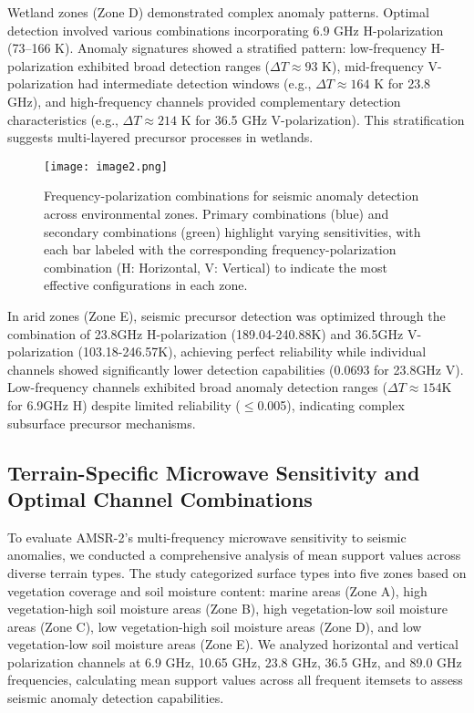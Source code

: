 \documentclass[fleqn,10pt]{wlscirep_mdpi_style}
\begin{document}
Wetland zones (Zone D) demonstrated complex anomaly patterns. Optimal detection involved various combinations incorporating 6.9 GHz H-polarization (73–166 K). Anomaly signatures showed a stratified pattern: low-frequency H-polarization exhibited broad detection ranges ($\Delta T \approx 93$ K), mid-frequency V-polarization had intermediate detection windows (e.g., $\Delta T \approx 164$ K for 23.8 GHz), and high-frequency channels provided complementary detection characteristics (e.g., $\Delta T \approx 214$ K for 36.5 GHz V-polarization). This stratification suggests multi-layered precursor processes in wetlands.

\begin{figure}[!htbp]
\centering
\texttt{[image: image2.png]}
\caption{Frequency-polarization combinations for seismic anomaly detection across environmental zones. Primary combinations (blue) and secondary combinations (green) highlight varying sensitivities, with each bar labeled with the corresponding frequency-polarization combination (H: Horizontal, V: Vertical) to indicate the most effective configurations in each zone.}
\label{fig:fig2}
\end{figure}
 
In arid zones (Zone E), seismic precursor detection was optimized through the combination of 23.8GHz H-polarization (189.04-240.88K) and 36.5GHz V-polarization (103.18-246.57K), achieving perfect reliability while individual channels showed significantly lower detection capabilities (0.0693 for 23.8GHz V). Low-frequency channels exhibited broad anomaly detection ranges ($\Delta T \approx 154$K for 6.9GHz H) despite limited reliability ($\le$0.005), indicating complex subsurface precursor mechanisms.
 
 
\subsection{Terrain-Specific Microwave Sensitivity and Optimal Channel Combinations}
To evaluate AMSR-2's multi-frequency microwave sensitivity to seismic anomalies, we conducted a comprehensive analysis of mean support values across diverse terrain types. The study categorized surface types into five zones based on vegetation coverage and soil moisture content: marine areas (Zone A), high vegetation-high soil moisture areas (Zone B), high vegetation-low soil moisture areas (Zone C), low vegetation-high soil moisture areas (Zone D), and low vegetation-low soil moisture areas (Zone E). We analyzed horizontal and vertical polarization channels at 6.9 GHz, 10.65 GHz, 23.8 GHz, 36.5 GHz, and 89.0 GHz frequencies, calculating mean support values across all frequent itemsets to assess seismic anomaly detection capabilities.
\end{document}
